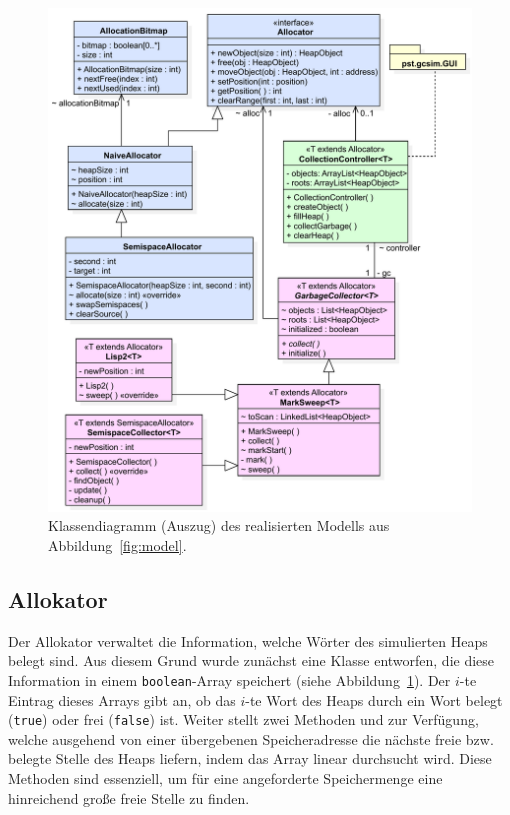 \begin{figure}[H]
	\centering
	\includegraphics[scale=0.65]{img/uml/ch7-klassen.pdf}
	\caption[Klassendiagramm des realisierten Modells (Auszug)]{Klassendiagramm (Auszug) des realisierten Modells aus Abbildung~\ref{fig:model}.}
	\label{fig:implementation}
\end{figure}

\subsection{Allokator}
\label{sub:allocator}
Der Allokator verwaltet die Information, welche Wörter des simulierten Heaps belegt sind.
Aus diesem Grund wurde zunächst eine Klasse  entworfen, die diese Information in einem \texttt{boolean}-Array speichert (siehe Abbildung~\ref{fig:implementation}).
Der $i$-te Eintrag dieses Arrays gibt an, ob das $i$-te Wort des Heaps durch ein Wort belegt (\texttt{true}) oder frei (\texttt{false}) ist.
Weiter stellt  zwei Methoden  und  zur Verfügung, welche ausgehend von einer übergebenen Speicheradresse die nächste freie bzw. belegte Stelle des Heaps liefern, indem das Array linear durchsucht wird.
Diese Methoden sind essenziell, um für eine angeforderte Speichermenge eine hinreichend große freie Stelle zu finden.

